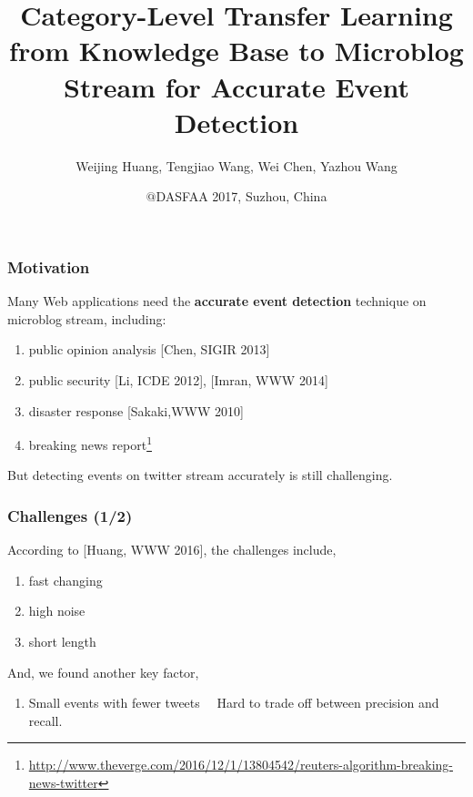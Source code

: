 \documentclass{beamer}
\begin{document}
\title[Category-Level Transfer Learning from Knowledge Base to Microblog Stream for Accurate Event Detection]{Category-Level Transfer Learning from Knowledge Base to Microblog Stream for Accurate Event Detection}
\author[Weijing Huang, et,al.]{Weijing Huang, Tengjiao Wang, Wei Chen, Yazhou Wang}
\date{\(\bm{@}\)DASFAA 2017, Suzhou, China}
\maketitle

\begin{frame}
\frametitle{Motivation}

Many Web applications need the \textbf{accurate event detection} technique on microblog stream, including:
\begin{enumerate}
	\item public opinion analysis [Chen, SIGIR 2013]
	\item public security [Li, ICDE 2012], [Imran, WWW 2014]
	\item disaster response [Sakaki,WWW 2010]
	\item breaking news report\footnote{\url{http://www.theverge.com/2016/12/1/13804542/reuters-algorithm-breaking-news-twitter}}
\end{enumerate}	
\vfill

But detecting events on twitter stream accurately is still challenging.
\end{frame}

\begin{frame}
\frametitle{Challenges (1/2)}
According to [Huang, WWW 2016], the challenges include,
\begin{enumerate}
\item fast changing
\item high noise
\item short length
\end{enumerate}	

\vfill

And, we found another key factor, 
\begin{enumerate}
\item Small events with fewer tweets \MVRightarrow \ \ Hard to trade off between precision and recall. 
\end{enumerate}




\end{frame}
\end{document}
